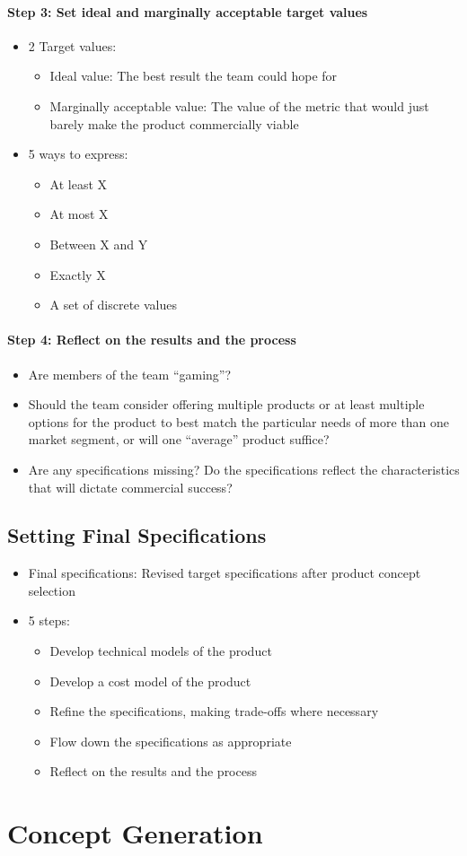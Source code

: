 \documentclass[a4paper,12pt,openany]{book}
\begin{document}
\subsubsection{Step 3: Set ideal and marginally acceptable target values}
\begin{itemize}
    \item 2 Target values:
    \begin{itemize}
        \item Ideal value: The best result the team could hope for
        \item Marginally acceptable value: The value of the metric that would just barely make the product commercially viable
    \end{itemize}
    \item 5 ways to express:
    \begin{itemize}
        \item At least X
        \item At most X
        \item Between X and Y
        \item Exactly X
        \item A set of discrete values
    \end{itemize}
\end{itemize}
\subsubsection{Step 4: Reflect on the results and the process}
\begin{itemize}
    \item Are members of the team ``gaming''?
    \item Should the team consider offering multiple products or at least multiple options for the product to best match the particular needs of more than one market segment, or will one ``average'' product suffice?
    \item Are any specifications missing? Do the specifications reflect the characteristics that will dictate commercial success?
\end{itemize}

\section{Setting Final Specifications}
\begin{itemize}
    \item Final specifications: Revised target specifications after product concept selection
    \item 5 steps:
    \begin{itemize}
        \item Develop technical models of the product
        \item Develop a cost model of the product
        \item Refine the specifications, making trade-offs where necessary
        \item Flow down the specifications as appropriate
        \item Reflect on the results and the process
    \end{itemize}
\end{itemize}

\chapter{Concept Generation}
\end{document}
